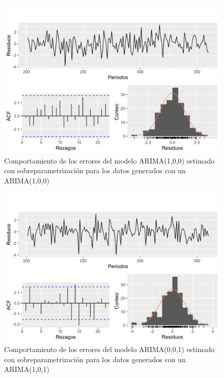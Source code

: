 \documentclass[
]{article}
\begin{document}
\begin{figure}[H]
\includegraphics[width=1\linewidth,height=1\textheight]{Tesis_files/figure-latex/errores_simulados_sobreparametrizacion1-1} \caption{Comportamiento de los errores del modelo ARIMA(1,0,0) estimado con sobreparametrización para los datos generados con un ARIMA(1,0,0)}\label{fig:errores_simulados_sobreparametrizacion1}
\end{figure}

\begin{figure}[H]
\includegraphics[width=1\linewidth,height=1\textheight]{Tesis_files/figure-latex/errores_simulados_sobreparametrizacion2-1} \caption{Comportamiento de los errores del modelo ARIMA(0,0,1) estimado con sobreparametrización para los datos generados con un ARIMA(1,0,1)}\label{fig:errores_simulados_sobreparametrizacion2}
\end{figure}
\end{document}
